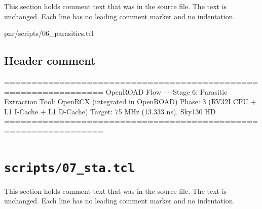 This section holds comment text that was in the source file. The text is unchanged. Each line has no leading comment marker and no indentation.

\begin{relocated}{pnr/scripts/06_parasitics.tcl}

\subsection*{Header comment}

\begin{textblock}
================================================================
OpenROAD Flow — Stage 6: Parasitic Extraction
Tool: OpenRCX (integrated in OpenROAD)
Phase: 3 (RV32I CPU + L1 I-Cache + L1 D-Cache)
Target: 75 MHz (13.333 ns), Sky130 HD
================================================================
\end{textblock}

\end{relocated}

\section{\texttt{scripts/07\_sta.tcl}}\label{tm:pd:scripts-07-sta-tcl}

This section holds comment text that was in the source file. The text is unchanged. Each line has no leading comment marker and no indentation.

